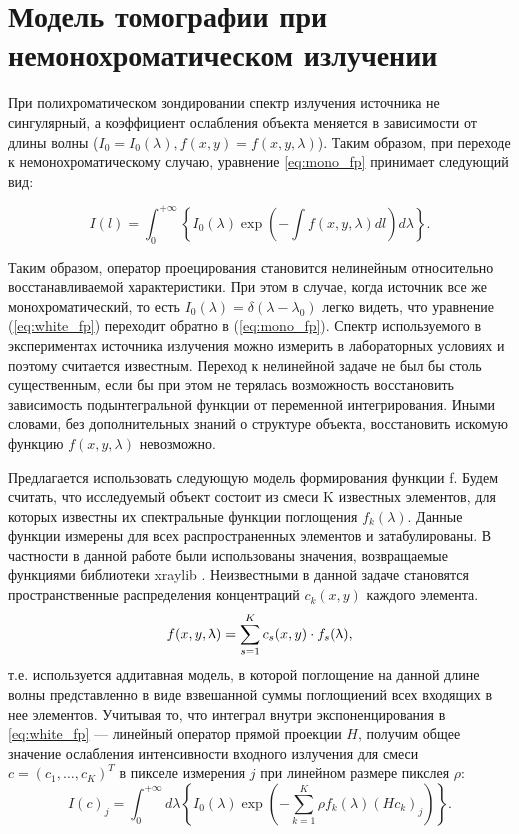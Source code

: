 \section{Модель томографии при немонохроматическом излучении}

При полихроматическом зондировании спектр излучения источника не сингулярный, а коэффициент ослабления объекта меняется в зависимости от длины волны ($I_0 = I_0(\lambda), f(x, y) = f(x, y, \lambda)$).
Таким образом, при переходе к немонохроматическому случаю, уравнение \eqref{eq:mono_fp} принимает следующий вид:

\begin{equation}
\label{eq:white_fp}
I(l) = \int_0^{+\infty}{\left\{
  I_0(\lambda) \exp{\left(-\int{f(x, y, \lambda) dl} \right) d\lambda} 
  \right\}}.
\end{equation}

Таким образом, оператор проецирования становится нелинейным относительно восстанавливаемой характеристики.
При этом в случае, когда источник все же монохроматический, то есть $I_0(\lambda) = \delta(\lambda - \lambda_0)$ легко видеть, что уравнение (\ref{eq:white_fp}) переходит обратно в (\eqref{eq:mono_fp}).
Спектр используемого в экспериментах источника излучения можно измерить в лабораторных условиях и поэтому считается известным.
Переход к нелинейной задаче не был бы столь существенным, если бы при этом не терялась возможность восстановить зависимость подынтегральной функции от переменной интегрирования. 
Иными словами, без дополнительных знаний о структуре объекта, восстановить искомую функцию $f(x, y, \lambda)$ невозможно.

Предлагается использовать следующую модель формирования функции f. %
Будем считать, что исследуемый объект состоит из смеси K известных элементов, для которых известны их спектральные функции поглощения $f_k(\lambda)$.
Данные функции измерены для всех распространенных элементов и затабулированы. В частности в данной работе были использованы значения, возвращаемые функциями библиотеки xraylib \cite{xraylib}.
Неизвестными в данной задаче становятся пространственные распределения концентраций $c_k(x, y)$ каждого элемента.
\begin{equation}
 \notag
  f(x, y, \lambda) = \sum_{s=1}^K {c_s(x, y) \cdot f_s(\lambda)},
\end{equation}
т.е. используется аддитавная модель, в которой поглощение на данной длине волны представленно в виде взвешанной суммы поглощиений всех входящих в нее элементов.
Учитывая то, что интеграл внутри экспоненцирования в \eqref{eq:white_fp} --- линейный оператор прямой проекции $H$, получим общее значение ослабления интенсивности входного излучения для смеси $c = (c_1, \dots, c_K)^T $ в пикселе измерения $j$ при линейном размере пикслея $\rho$:
\begin{equation}
  \label{eq:white_fp_final}
  I(c)_j = \int_0^{+\infty} {d\lambda \left\{
    I_0(\lambda) \exp{\left(
      -\sum_{k=1}^K {\rho f_k(\lambda) (H c_k)_j} 
      \right)}
  \right\}}.
\end{equation}

